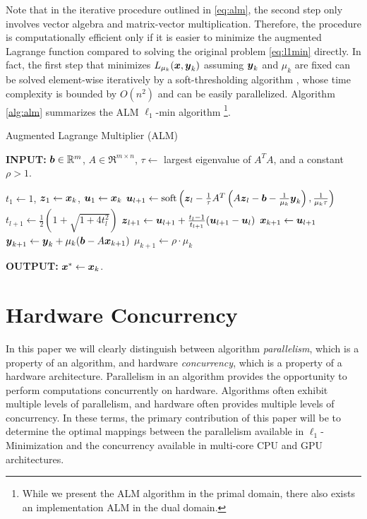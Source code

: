 \documentclass[10pt,twocolumn,letterpaper]{article}
\begin{document}
Note that in the iterative procedure outlined in \eqref{eq:alm}, the second
step only involves vector algebra and matrix-vector multiplication. Therefore,
the procedure is computationally efficient only if it is easier to minimize the
augmented Lagrange function compared to solving the original problem
\eqref{eq:l1min} directly. In fact, the first step that minimizes $L_{\mu_k}
({\boldsymbol{x}},{\boldsymbol{y}}_k)$ assuming ${\boldsymbol{y}}_k$ and $\mu_k$ are fixed can be solved element-wise
iteratively by a soft-thresholding algorithm \cite{WrightS2008,BeckA2009},
whose time complexity is bounded by $O(n^2)$ and can be easily parallelized.
Algorithm \eqref{alg:alm} summarizes the ALM $\ell_1$-min algorithm \footnote{While we
present the ALM algorithm in the primal domain, there also
exists an implementation ALM in the dual domain.}.

 \begin{algorithm}[h]
\caption{Augmented Lagrange Multiplier (ALM)}
{\bf INPUT:} ${\boldsymbol{b}} \in {\mathbb{R}}^m$, $A \in \Re^{m \times n}$, $\tau\leftarrow$ largest eigenvalue of $A^TA$, and a constant $\rho>1$.
\begin{algorithmic}[1]
 \STATE $t_1 \leftarrow 1$, ${\boldsymbol{z}}_1
\leftarrow {\boldsymbol{x}}_k$, ${\boldsymbol{u}}_1 \leftarrow {\boldsymbol{x}}_k$  \STATE ${\boldsymbol{u}}_{l+1}  \leftarrow
\mathrm{soft}\left({\boldsymbol{z}}_l - \frac{1}{\tau}A^T\left(A{\boldsymbol{z}}_l - {\boldsymbol{b}}
- \frac{1}{\mu_k}{\boldsymbol{y}}_k\right), \frac{1}{\mu_k\tau}\right)$
\STATE $t_{l+1} \leftarrow \frac{1}{2}\left( 1 +
\sqrt{1+4t_l^2}\right)$ \STATE ${\boldsymbol{z}}_{l+1} \leftarrow {\boldsymbol{u}}_{l+1}
+ \frac{t_l - 1}{t_{l+1}}({\boldsymbol{u}}_{l+1} - {\boldsymbol{u}}_l)$ \ENDWHILE \STATE$
{\boldsymbol{x}}_{k+1} \leftarrow {\boldsymbol{u}}_{l+1}$ \STATE ${\boldsymbol{y}}_{k+1} \leftarrow
{\boldsymbol{y}}_k + \mu_k ({\boldsymbol{b}} - A{\boldsymbol{x}}_{k+1})$ \STATE $\mu_{k+1} \leftarrow
\rho\cdot\mu_k$ \ENDWHILE 
\end{algorithmic}

{\bf OUTPUT:} ${\boldsymbol{x}}^* \leftarrow {\boldsymbol{x}}_k$.
\label{alg:alm}
\end{algorithm}

\section{Hardware Concurrency} \label{sec:parallelism} 

In this paper we will clearly distinguish between algorithm {\em parallelism},
which is a property of an algorithm, and hardware {\em concurrency}, which is a
property of a hardware architecture.  Parallelism in an algorithm provides the
opportunity to perform computations concurrently on hardware.  Algorithms often
exhibit multiple levels of parallelism, and hardware often provides multiple
levels of concurrency.  In these terms, the primary contribution of this paper
will be to determine the optimal mappings between the parallelism available in
$\ell_1$-Minimization and the concurrency available in multi-core CPU and GPU architectures.
\end{document}
